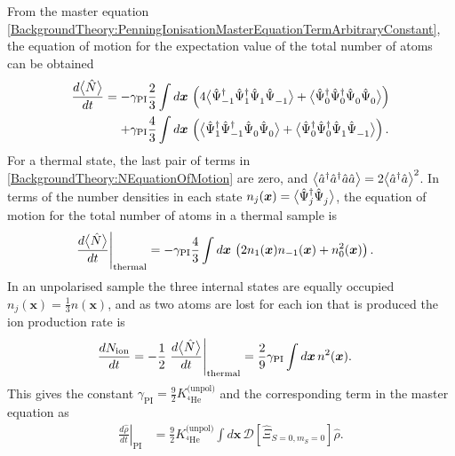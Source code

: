 From the master equation \eqref{BackgroundTheory:PenningIonisationMasterEquationTermArbitraryConstant}, the equation of motion for the expectation value of the total number of atoms can be obtained
\begin{align}
    \label{BackgroundTheory:NEquationOfMotion}
    \begin{split}
        \frac{d \mean{\hat{N}}}{d t} &= - \gamma_\text{PI} \frac{2}{3}\int d \bm{x}\, \left(4 \mean{\hat{\Psi}_{-1}^\dagger \hat{\Psi}_1^\dagger \hat{\Psi}_1^{\phantom{\dagger}}\hat{\Psi}_{-1}^{\phantom{\dagger}}} + \mean{\hat{\Psi}_0^\dagger \hat{\Psi}_0^\dagger \hat{\Psi}_0^{\phantom{\dagger}} \hat{\Psi}_0^{\phantom{\dagger}}}\right)\\
        &\relphantom{=} + \gamma_\text{PI} \frac{4}{3}\int d \bm{x}\, \left( \mean{\hat{\Psi}_1^\dagger \hat{\Psi}_{-1}^\dagger \hat{\Psi}_0^{\phantom{\dagger}} \hat{\Psi}_0^{\phantom{\dagger}}} +  \mean{\hat{\Psi}_0^\dagger \hat{\Psi}_0^\dagger \hat{\Psi}_1^{\phantom{\dagger}} \hat{\Psi}_{-1}^{\phantom{\dagger}}} \right).
    \end{split}
\end{align}
For a thermal state, the last pair of terms in \eqref{BackgroundTheory:NEquationOfMotion} are zero, and ${\big<\hat{a}^\dagger \hat{a}^\dagger \hat{a} \hat{a}\big>} = 2 {\big<\hat{a}^\dagger \hat{a}\big>}^2$. In terms of the number densities in each state $n_j(\bm{x}) = {\big<\hat{\Psi}_j^\dagger \hat{\Psi}_j^{\phantom{\dagger}}\big>}$, the equation of motion for the total number of atoms in a thermal sample is
\begin{align}
    \left.\frac{d {\big<\hat{N}\big>}}{dt} \right|_\text{thermal} &= - \gamma_\text{PI} \frac{4}{3} \int d \bm{x}\, \left(2 n_1(\bm{x}) n_{-1}(\bm{x}) + n_0^2(\bm{x})\right).
\end{align}
In an unpolarised sample the three internal states are equally occupied $\displaystyle n_j(\bm{x}) = \frac{1}{3}n(\bm{x})$, and as two atoms are lost for each ion that is produced the ion production rate is
\begin{align}
    \frac{d N_\text{ion}}{dt} &= -\frac{1}{2} \left.\frac{d {\big<\hat{N}\big>}}{dt}\right|_\text{thermal} = \frac{2}{9} \gamma_\text{PI} \int d \bm{x}\, n^2(\bm{x}).
\end{align}
This gives the constant $\displaystyle\gamma_\text{PI} = \frac{9}{2} K^\text{(unpol)}_{^4\text{He}}$ and the corresponding term in the master equation as
\begin{align}
    \label{BackgroundTheory:PenningIonisationMasterEquationTerm}
    \left.\frac{d \hat{\rho}}{dt}\right|_\text{PI} &= \frac{9}{2} K^\text{(unpol)}_{^4\text{He}} \int d \bm{x}\, \mathcal{D}\left[ \hat{\Xi}_{S=0, m_S=0}\right] \hat{\rho}.
\end{align}

